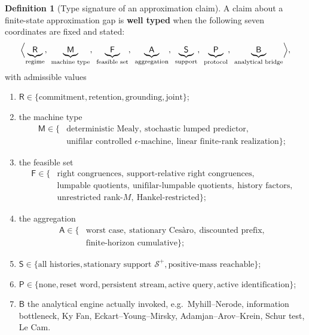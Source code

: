 \documentclass[12pt]{article}
\theoremstyle{definition}
\newtheorem{definition}[theorem]{Definition}
\newcommand{\Splus}{\mathcal S^{+}}
\begin{document}
\begin{definition}[Type signature of an approximation claim]
\label{def:type-signature}
A claim about a finite-state approximation gap is \textbf{well typed} when the
following seven coordinates are fixed and stated:
\[
\Bigl\langle
\underbrace{\mathsf R}_{\text{regime}},\
\underbrace{\mathsf M}_{\text{machine type}},\
\underbrace{\mathsf F}_{\text{feasible set}},\
\underbrace{\mathsf A}_{\text{aggregation}},\
\underbrace{\mathsf S}_{\text{support}},\
\underbrace{\mathsf P}_{\text{protocol}},\
\underbrace{\mathsf B}_{\text{analytical bridge}}
\Bigr\rangle,
\]
with admissible values
\begin{enumerate}[label=(\arabic*),leftmargin=2.2em]
\item $\mathsf R\in\{\text{commitment},\text{retention},\text{grounding},
\text{joint}\}$;
\item the machine type
\[
\begin{aligned}
\mathsf M\in\bigl\{&\text{deterministic Mealy},\ \text{stochastic lumped
predictor},\\
&\text{unifilar controlled }\epsilon\text{-machine},\
\text{linear finite-rank realization}\bigr\};
\end{aligned}
\]
\item the feasible set
\[
\begin{aligned}
\mathsf F\in\bigl\{&\text{right congruences},\
\text{support-relative right congruences},\\
&\text{lumpable quotients},\ \text{unifilar-lumpable quotients},\
\text{history factors},\\
&\text{unrestricted rank-}M,\ \text{Hankel-restricted}\bigr\};
\end{aligned}
\]
\item the aggregation
\[
\begin{aligned}
\mathsf A\in\bigl\{&\text{worst case},\ \text{stationary Ces\`aro},\
\text{discounted prefix},\\
&\text{finite-horizon cumulative}\bigr\};
\end{aligned}
\]
\item $\mathsf S\in\{\text{all histories},\text{stationary support }\Splus,
\text{positive-mass reachable}\}$;
\item $\mathsf P\in\{\text{none},\text{reset word},\text{persistent stream},
\text{active query},\text{active identification}\}$;
\item $\mathsf B$ the analytical engine actually invoked, e.g.\
Myhill--Nerode, information bottleneck, Ky Fan, Eckart--Young--Mirsky,
Adamjan--Arov--Krein, Schur test, Le Cam.
\end{enumerate}
\end{definition}
\end{document}
